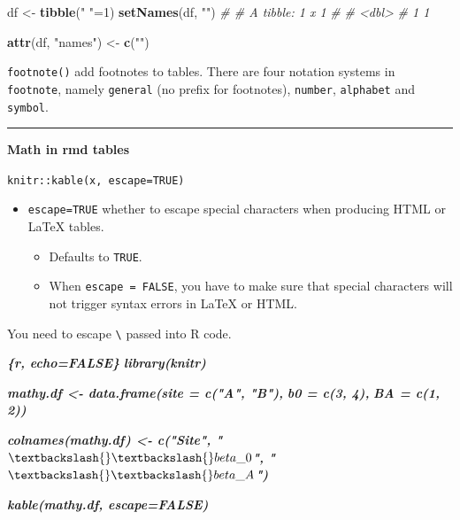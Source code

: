 \documentclass[
  a4paper,
  twoside,
  openright]{book}
\newenvironment{Shaded}{\begin{snugshade}}{\end{snugshade}}
\newcommand{\CommentTok}[1]{\textcolor[rgb]{0.56,0.35,0.01}{\textit{#1}}}
\newcommand{\DecValTok}[1]{\textcolor[rgb]{0.00,0.00,0.81}{#1}}
\newcommand{\FunctionTok}[1]{\textcolor[rgb]{0.13,0.29,0.53}{\textbf{#1}}}
\newcommand{\InformationTok}[1]{\textcolor[rgb]{0.56,0.35,0.01}{\textbf{\textit{#1}}}}
\newcommand{\NormalTok}[1]{#1}
\newcommand{\OtherTok}[1]{\textcolor[rgb]{0.56,0.35,0.01}{#1}}
\newcommand{\StringTok}[1]{\textcolor[rgb]{0.31,0.60,0.02}{#1}}
\providecommand{\tightlist}{%
  \setlength{\itemsep}{0pt}\setlength{\parskip}{0pt}}
\theoremstyle{definition}
\theoremstyle{definition}
\theoremstyle{definition}
\theoremstyle{definition}
\theoremstyle{remark}
\begin{document}
\begin{Shaded}
\begin{Highlighting}[]
\NormalTok{df }\OtherTok{\textless{}{-}} \FunctionTok{tibble}\NormalTok{(}\StringTok{" "}\OtherTok{=}\DecValTok{1}\NormalTok{)}
\FunctionTok{setNames}\NormalTok{(df, }\StringTok{""}\NormalTok{)}
\CommentTok{\# \# A tibble: 1 x 1}
\CommentTok{\#      \textasciigrave{}\textasciigrave{}}
\CommentTok{\#   \textless{}dbl\textgreater{}}
\CommentTok{\# 1     1}

\FunctionTok{attr}\NormalTok{(df, }\StringTok{"names"}\NormalTok{) }\OtherTok{\textless{}{-}} \FunctionTok{c}\NormalTok{(}\StringTok{""}\NormalTok{)}
\end{Highlighting}
\end{Shaded}

\texttt{footnote()} add footnotes to tables. There are four notation systems in \texttt{footnote}, namely \texttt{general} (no prefix for footnotes), \texttt{number}, \texttt{alphabet} and \texttt{symbol}.

\begin{center}\rule{0.5\linewidth}{0.5pt}\end{center}

\textbf{Math in rmd tables}

\texttt{knitr::kable(x,\ escape=TRUE)}

\begin{itemize}
\tightlist
\item
  \texttt{escape=TRUE} whether to escape special characters when producing HTML or LaTeX tables.

  \begin{itemize}
  \tightlist
  \item
    Defaults to \texttt{TRUE}.
  \item
    When \texttt{escape\ =\ FALSE}, you have to make sure that special characters will not trigger syntax errors in LaTeX or HTML.
  \end{itemize}
\end{itemize}

You need to escape \texttt{\textbackslash{}} passed into R code.

\begin{Shaded}
\begin{Highlighting}[]
\InformationTok{\textasciigrave{}\textasciigrave{}\textasciigrave{}\{r, echo=FALSE\}}
\InformationTok{library(knitr)}

\InformationTok{mathy.df \textless{}{-} data.frame(site = c("A", "B"), }
\InformationTok{                       b0 = c(3, 4), }
\InformationTok{                       BA = c(1, 2))}

\InformationTok{colnames(mathy.df) \textless{}{-} c("Site", "$\textbackslash{}\textbackslash{}beta\_0$", "$\textbackslash{}\textbackslash{}beta\_A$")}

\InformationTok{kable(mathy.df, escape=FALSE)}
\InformationTok{\textasciigrave{}\textasciigrave{}\textasciigrave{}}
\end{Highlighting}
\end{Shaded}
\end{document}
